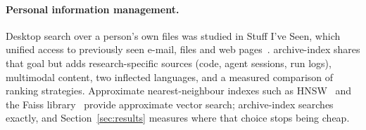\paragraph{Personal information management.}
Desktop search over a person's own files was studied in Stuff I've Seen, which unified access to previously seen e-mail, files and web pages~\citep{dumais2003sis}. archive-index shares that goal but adds research-specific sources (code, agent sessions, run logs), multimodal content, two inflected languages, and a measured comparison of ranking strategies. Approximate nearest-neighbour indexes such as HNSW~\citep{malkov2020hnsw} and the Faiss library~\citep{douze2024faiss} provide approximate vector search; archive-index searches exactly, and Section~\ref{sec:results} measures where that choice stops being cheap.
